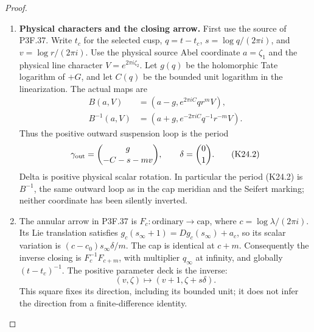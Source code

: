 \begin{proof}
\begin{enumerate}[label=\arabic*.]
\item \par\medskip\noindent\textbf{Physical characters and the closing arrow.}
First use the source of P3F.37. Write $t_c$ for the selected cusp,
$q=t-t_c$, $s=\log q/(2\pi i)$, and $v=\log r/(2\pi i)$.
Use the physical source Abel coordinate $a=\zeta_1$ and the
physical line character $V=e^{2\pi i\zeta_2}$. Let $g(q)$
be the holomorphic Tate logarithm of $+G$, and let $C(q)$ be
the bounded unit logarithm in the linearization. The actual maps
are
\[
 \begin{aligned}
 B(a,V)&=(a-g,e^{2\pi iC}qr^mV),\\
 B^{-1}(a,V)&=(a+g,e^{-2\pi iC}q^{-1}r^{-m}V).
 \end{aligned}
\]
Thus the positive outward suspension loop is the period
\[
 \gamma_{\rm out}=\binom{g}{-C-s-mv},\qquad
 \delta=\binom01.                                    \tag{K24.2}
\]
Delta is positive physical scalar rotation. In particular the
period (K24.2) is $B^{-1}$, the same outward loop as in the
cap meridian and the Seifert marking; neither coordinate has
been silently inverted.

\item The annular arrow in P3F.37 is
$F_c:\text{ordinary}\to\text{cap}$, where
$c=\log\lambda/(2\pi i)$. Its Lie translation satisfies
$g_c(s_\infty+1)=Dg_c(s_\infty)+a_c$, so its scalar variation
is $(c-c_0)s_\infty\delta/m$. The cap is identical at $c+m$.
Consequently the inverse closing is $F_c^{-1}F_{c+m}$, with
multiplier $q_\infty$ at infinity, and globally
$(t-t_c)^{-1}$. The positive parameter deck is the inverse:
\[
              (v,\zeta)\longmapsto(v+1,\zeta+s\delta). \tag{K24.3}
\]
This square fixes its direction, including its bounded unit;
it does not infer the direction from a finite-difference identity.


\end{enumerate}
\end{proof}
